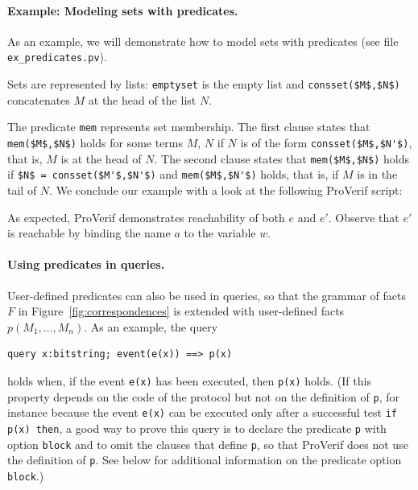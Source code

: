 \documentclass{book}
\begin{document}
\paragraph{Example: Modeling sets with predicates.}

As an example, we will demonstrate how to model sets with predicates
(see file \texttt{{\docexdir}ex\_predicates.pv}).
%

%
Sets are represented by lists: \lstinline!emptyset! is the empty list
and \lstinline!consset($M$,$N$)! concatenates $M$ at the head of
the list $N$.
%

%
The predicate \lstinline!mem! represents set membership.
The first clause states that \lstinline!mem($M$,$N$)! holds for some terms $M$, $N$ if $N$ is of the form \lstinline!consset($M$,$N'$)!, that is, $M$ is at the head of $N$. The second clause states that \lstinline!mem($M$,$N$)! holds if \lstinline!$N$ = consset($M'$,$N'$)! and \lstinline!mem($M$,$N'$)! holds, that is, if $M$ is in the tail of $N$.
We conclude our example with a look at the following ProVerif script:
%

%
As expected, ProVerif demonstrates reachability of both $e$ and $e'$. Observe that $e'$ is reachable by binding the name $a$ to the variable $w$.

\paragraph{Using predicates in queries.} User-defined predicates can also be used in queries, so that the grammar of facts $F$ in Figure~\ref{fig:correspondences} is extended with user-defined facts $p(M_1, \ldots, M_n)$. As an example, the query
\begin{lstlisting}[numbers=none]
query x:bitstring; event(e(x)) ==> p(x)
\end{lstlisting}
holds when, if the event \lstinline!e(x)! has been executed, then \lstinline!p(x)! holds.
(If this property depends on the code of the protocol but not on the definition of \lstinline!p!, for instance because the event \lstinline!e(x)! can be executed only after a successful test \lstinline!if p(x) then!, a good way to prove this query is to declare the predicate \lstinline!p! with option \lstinline!block! and to omit the clauses that define \lstinline!p!, so that ProVerif does not use the definition of \lstinline!p!. See below for additional information on the predicate option \lstinline!block!.)
\end{document}
